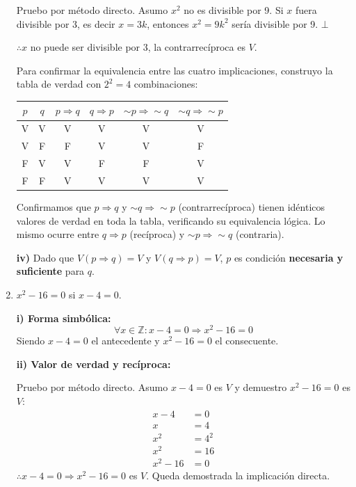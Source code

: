 \documentclass[12pt]{article}
\begin{document}
\begin{enumerate}[label=\alph*.-]
    Pruebo por método directo. Asumo $x^2$ no es divisible por 9. Si $x$ fuera divisible por 3, es decir $x = 3k$, entonces $x^2 = 9k^2$ sería divisible por 9. $\bot$ 
    
    $\therefore x$ no puede ser divisible por 3, la contrarrecíproca es $V$.

    Para confirmar la equivalencia entre las cuatro implicaciones, construyo la tabla de verdad con $2^2 = 4$ combinaciones:

    \begin{center}
    \begin{tabular}{cc|c|c|c|c}
        \toprule
        $p$ & $q$ & $p \Rightarrow q$ & $q \Rightarrow p$ & $\sim p \Rightarrow \sim q$ & $\sim q \Rightarrow \sim p$ \\
        \midrule
        V & V & V & V & V & V \\
        V & F & F & V & V & F \\
        F & V & V & F & F & V \\
        F & F & V & V & V & V \\
        \bottomrule
    \end{tabular}
    \end{center}

    Confirmamos que $p \Rightarrow q$ y $\sim q \Rightarrow \sim p$ (contrarrecíproca) tienen idénticos valores de verdad en toda la tabla, verificando su equivalencia lógica. Lo mismo ocurre entre $q \Rightarrow p$ (recíproca) y $\sim p \Rightarrow \sim q$ (contraria).

    \textbf{iv)} Dado que $V(p \Rightarrow q) = V$ y $V(q \Rightarrow p) = V$, $p$ es condición \textbf{necesaria y suficiente} para $q$.

    \item $x^2 - 16 = 0$ si $x - 4 = 0$.

    \textbf{i) Forma simbólica:}
    \[\forall x \in \mathbb{Z}: x - 4 = 0 \Rightarrow x^2 - 16 = 0\]
    Siendo $x - 4 = 0$ el antecedente y $x^2 - 16 = 0$ el consecuente.

    \textbf{ii) Valor de verdad y recíproca:}

    Pruebo por método directo. Asumo $x - 4 = 0$ es $V$ y demuestro $x^2 - 16 = 0$ es $V$:
    \begin{align*}
        x - 4 &= 0 \\
        x &= 4 \\
        x^2 &= 4^2 \\
        x^2 &= 16 \\
        x^2 - 16 &= 0
    \end{align*}
    $\therefore x - 4 = 0 \Rightarrow x^2 - 16 = 0$ es $V$. Queda demostrada la implicación directa.


\end{enumerate}
\end{document}
